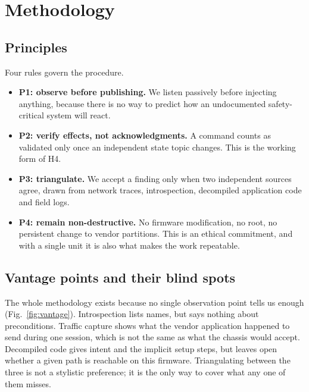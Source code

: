 
\section{Methodology}
\label{sec:method}

\subsection{Principles}

Four rules govern the procedure.

\begin{itemize}[leftmargin=1.2em]
\item \textbf{P1: observe before publishing.} We listen passively before injecting anything,
because there is no way to predict how an undocumented safety-critical system will react.
\item \textbf{P2: verify effects, not acknowledgments.} A command counts as validated only
once an independent state topic changes. This is the working form of H4.
\item \textbf{P3: triangulate.} We accept a finding only when two independent sources agree,
drawn from network traces, introspection, decompiled application code and field logs.
\item \textbf{P4: remain non-destructive.} No firmware modification, no root, no persistent
change to vendor partitions. This is an ethical commitment, and with a single unit it is also
what makes the work repeatable.
\end{itemize}

\subsection{Vantage points and their blind spots}

The whole methodology exists because no single observation point tells us enough
(Fig.~\ref{fig:vantage}). Introspection lists names, but says nothing about preconditions.
Traffic capture shows what the vendor application happened to send during one session, which is
not the same as what the chassis would accept. Decompiled code gives intent and the implicit
setup steps, but leaves open whether a given path is reachable on this firmware. Triangulating
between the three is not a stylistic preference; it is the only way to cover what any one of
them misses.

